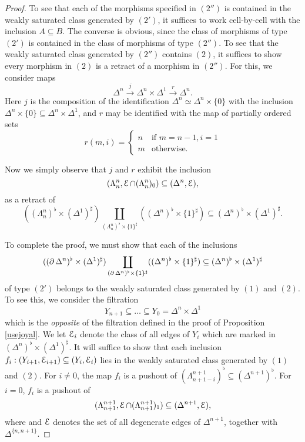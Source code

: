 \begin{proof}
To see that each of the morphisms specified in $(2'')$ is contained in the weakly saturated class generated by $(2')$, it suffices to work cell-by-cell with the inclusion $A \subseteq B$. The converse is obvious, since the class of morphisms of type $(2')$ is contained in the class of morphisms of type $(2'')$. To see that the weakly saturated class generated by $(2'')$ contains $(2)$, it suffices to show every morphism in $(2)$ is a retract of a morphism in $(2'')$. For this, we consider
maps
$$\Delta^{n} \stackrel{j}{\rightarrow} \Delta^n \times \Delta^1 \stackrel{r}{\rightarrow} \Delta^{n}.$$ 
Here $j$ is the composition of the identification $\Delta^n \simeq \Delta^n \times \{0\}$ with the inclusion $\Delta^n \times \{0\} \subseteq \Delta^n \times \Delta^1$, and $r$ may be identified with the map of partially ordered sets
$$r(m,i) =
\begin{cases} n & \text{if } m = n-1, i=1 \\
m & \text{otherwise.}  \end{cases}$$

Now we simply observe that $j$ and $r$ exhibit the inclusion
$$ ( \Lambda^n_n, \operatorname{\mathcal{E}} \cap (\Lambda^n_n)_{0} ) \subseteq ( \Delta^n, \operatorname{\mathcal{E}} ),$$
as a retract of
$$ ( (\Lambda^n_n)^{\flat} \times (\Delta^1)^{\sharp})  \coprod_{ (\Lambda_n^n)^{\flat} \times
\{1\}^{\sharp} } ((\Delta^n)^{\flat} \times \{1\}^{\sharp}) \subseteq (\Delta^n)^{\flat} \times (\Delta^1)^{\sharp}.$$ 

To complete the proof, we must show that each of the inclusions
$$ ( (\operatorname{\partial} \Delta^n)^{\flat} \times (\Delta^1)^{\sharp})  \coprod_{ (\operatorname{\partial} \Delta^n)^{\flat} \times
\{1\}^{\sharp} } ((\Delta^n)^{\flat} \times \{1\}^{\sharp}) \subseteq (\Delta^n)^{\flat} \times (\Delta^1)^{\sharp}$$ 
of type $(2')$ belongs to the weakly saturated class generated by $(1)$ and $(2)$. To see this, we
consider the filtration
$$ Y_{n+1} \subseteq \ldots \subseteq Y_0 = \Delta^n \times \Delta^1$$ which is the
{\em opposite} of the filtration defined in the proof of Proposition \ref{usejoyal}.
We let $\operatorname{\mathcal{E}}_i$ denote the class of all edges of $Y_i$ which are marked in
$(\Delta^n)^{\flat} \times (\Delta^1)^{\sharp}$. 
It will suffice to show that each inclusion $f_i: (Y_{i+1},\operatorname{\mathcal{E}}_{i+1}) \subseteq (Y_{i}, \operatorname{\mathcal{E}}_{i})$ lies in the weakly saturated class generated by $(1)$ and $(2)$. For $i \neq 0$, the map $f_i$ is a pushout of
$(\Lambda^{n+1}_{n+1-i})^{\flat} \subseteq (\Delta^{n+1})^{\flat}$. For $i=0$, $f_i$
is a pushout of 
$$ ( \Lambda^{n+1}_{n+1}, \operatorname{\mathcal{E}} \cap (\Lambda^{n+1}_{n+1})_{1} ) \subseteq ( \Delta^{n+1}, \operatorname{\mathcal{E}} ),$$
where and $\operatorname{\mathcal{E}}$ denotes the set of all degenerate edges of $\Delta^{n+1}$, together with $\Delta^{ \{n,n+1\}}$.
\end{proof}

